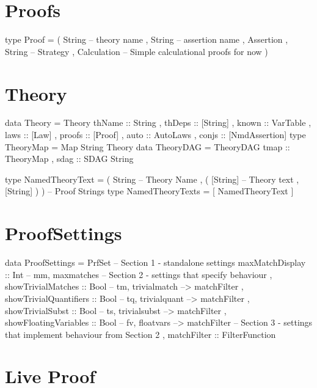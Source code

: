 \section{Proofs}

\begin{code}
type Proof
  = ( String -- theory name
    , String -- assertion name
    , Assertion
    , String -- Strategy
    , Calculation -- Simple calculational proofs for now
    )
\end{code}

\newpage
\section{Theory}

\begin{code}
data Theory
  = Theory {
      thName      :: String
    , thDeps      :: [String]
    , known       :: VarTable
    , laws        :: [Law]
    , proofs      :: [Proof]
    , auto        :: AutoLaws
    , conjs       :: [NmdAssertion]
    }
type TheoryMap = Map String Theory
data TheoryDAG
  = TheoryDAG { tmap :: TheoryMap
             , sdag :: SDAG String }

type NamedTheoryText  =  ( String      -- Theory Name
                         , ( [String] -- Theory text
                           , [String] ) )   -- Proof Strings
type NamedTheoryTexts = [ NamedTheoryText ]
\end{code}


\section{ProofSettings}

\begin{code}
data ProofSettings
  = PrfSet {
     -- Section 1 - standalone settings
       maxMatchDisplay :: Int -- mm, maxmatches
     -- Section 2 - settings that specify behaviour
     , showTrivialMatches :: Bool -- tm, trivialmatch --> matchFilter
     , showTrivialQuantifiers :: Bool -- tq, trivialquant --> matchFilter
     , showTrivialSubst :: Bool -- ts, trivialsubst --> matchFilter
     , showFloatingVariables :: Bool -- fv, floatvars --> matchFilter
     -- Section 3 - settings that implement behaviour from Section 2
     , matchFilter :: FilterFunction
     }
\end{code}


\section{Live Proof}

